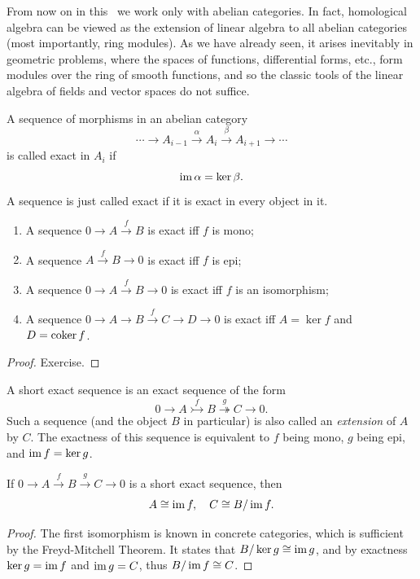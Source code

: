 From now on in this \partt\ we work only with abelian categories. In fact, homological algebra can be viewed as the extension of linear algebra to all abelian categories (most importantly, ring modules). As we have already seen, it arises inevitably in geometric problems, where the spaces of functions, differential forms, etc., form modules over the ring of smooth functions, and so the classic tools of the linear algebra of fields and vector spaces do not suffice.

\begin{defn}
    A sequence of morphisms in an abelian category 
    \[\cdots \to A_{i-1}\overset{\alpha}\to A_i\overset{\beta}\to A_{i+1}\to \cdots\]
    is called exact in $A_i$ if 
    \[\operatorname{im}\alpha=\ker\beta.\]
    A sequence is just called exact if it is exact in every object in it.
\end{defn}

\begin{prop}
    \begin{enumerate}
        \item A sequence $0\to A\overset f\to B$ is exact iff $f$ is mono;
        \item A sequence $A\overset f\to B\to 0$ is exact iff $f$ is epi;
        \item A sequence $0\to A\overset f\to B\to 0$ is exact iff $f$ is an isomorphism;
        \item A sequence $0\to A\to B\overset f\to C\to D\to 0$ is exact iff $A=\ker f$ and $D=\operatorname{coker} f$.
    \end{enumerate}
\end{prop}
\begin{proof}
    Exercise.
\end{proof}

\begin{defn}
 A short exact sequence is an exact sequence of the form
 \[0\to A\overset f\rightarrowtail B\overset g \twoheadrightarrow C\to 0.\]
 Such a sequence (and the object $B$ in particular) is also called an \emph{extension} of $A$ by $C$. The exactness of this sequence is equivalent to $f$ being mono, $g$ being epi, and $\operatorname{im} f=\ker g$.
\end{defn}

\begin{prop}
    If $0\to A\overset f\to B\overset g \to C\to 0$ is a short exact sequence, then 
    \[A\cong \operatorname{im} f,\quad C\cong B/\operatorname{im} f.\]
\end{prop}
\begin{proof}
    The first isomorphism is known in concrete categories, which is sufficient by the Freyd-Mitchell Theorem. It states that $B/\ker g\cong \operatorname{im} g$, and by exactness $\ker g=\operatorname{im} f$ and $\operatorname{im} g=C$, thus $B/\operatorname{im} f\cong C$.
\end{proof}

